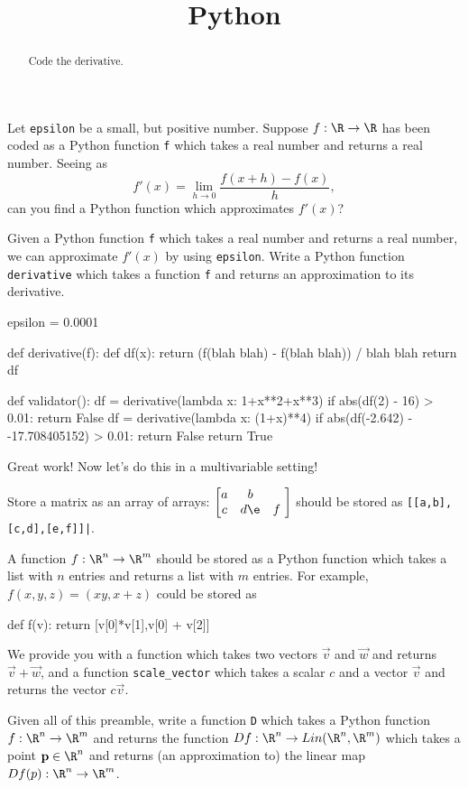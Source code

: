\documentclass{ximera}
\title{Python}
\begin{document}
\begin{abstract}
  Code the derivative.	
\end{abstract}

\begin{exercise}
  Let \texttt{epsilon} be a small, but positive number.  Suppose $f:\R
  \to \R$ has been coded as a Python function \texttt{f} which takes a
  real number and returns a real number.  Seeing as
  $$
  f'(x) = \lim_{h \to 0} \frac{f(x+h) - f(x)}{h},
  $$
  can you find a Python function which approximates $f'(x)$?

  Given a Python function \texttt{f} which takes a real number and
  returns a real number, we can approximate $f'(x)$ by using
  \texttt{epsilon}.  Write a Python function \texttt{derivative} which
  takes a function \texttt{f} and returns an approximation to its
  derivative.

\begin{python}
epsilon = 0.0001

def derivative(f):
  def df(x): return (f(blah blah) - f(blah blah)) / blah blah
  return df

def validator():
  df = derivative(lambda x: 1+x**2+x**3)
  if abs(df(2) - 16) > 0.01:
    return False
  df = derivative(lambda x: (1+x)**4)
  if abs(df(-2.642) - -17.708405152) > 0.01:
    return False
  return True
\end{python}

  Great work!  Now let's do this in a multivariable setting!

  Store a matrix as an array of arrays: $\begin{bmatrix} a&b\\c&d
    \e&f\ \end{bmatrix}$ should be stored as
  \texttt{[[a,b],[c,d],[e,f]]|}.

  A function $f:\R^n \to \R^m$ should be stored as a Python function
  which takes a list with $n$ entries and returns a list with $m$
  entries.  For example, $f(x,y,z) = (xy,x+z)$ could be stored as
  \begin{pre}
def f(v):
  return [v[0]*v[1],v[0] + v[2]]
\end{pre}
	
We provide you with a function  which takes two
vectors $\vec{v}$ and $\vec{w}$ and returns $\vec{v}+\vec{w}$, and a
function \texttt{scale_vector} which takes a scalar $c$ and a vector
$\vec{v}$ and returns the vector $c\vec{v}$.

Given all of this preamble, write a function \texttt{D} which takes a
Python function $f: \R^n \to \R^m$ and returns the function $Df: \R^n
\to Lin(\R^n,\R^m)$ which takes a point $\mathbf{p} \in \R^n$ and
returns (an approximation to) the linear map $Df(p):\R^n \to \R^m$.
	

\end{exercise}
\end{document}

